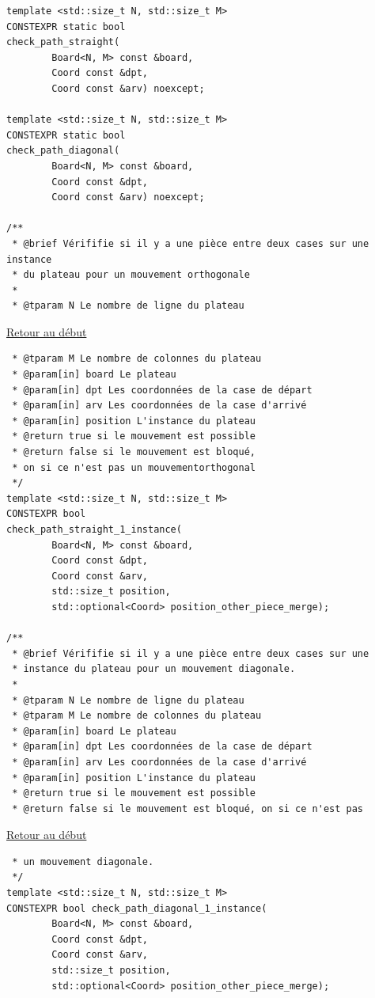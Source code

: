 {\begin{frame}[fragile]
\begin{verbatim}
template <std::size_t N, std::size_t M>
CONSTEXPR static bool
check_path_straight(
		Board<N, M> const &board,
		Coord const &dpt,
		Coord const &arv) noexcept;

template <std::size_t N, std::size_t M>
CONSTEXPR static bool
check_path_diagonal(
		Board<N, M> const &board,
		Coord const &dpt,
		Coord const &arv) noexcept;

/**
 * @brief Vérififie si il y a une pièce entre deux cases sur une instance
 * du plateau pour un mouvement orthogonale
 *
 * @tparam N Le nombre de ligne du plateau
\end{verbatim}
\end{frame}

\begin{frame}[fragile]
\hyperlink{conclusion}{Retour au début}\newline
\begin{verbatim}
 * @tparam M Le nombre de colonnes du plateau
 * @param[in] board Le plateau
 * @param[in] dpt Les coordonnées de la case de départ
 * @param[in] arv Les coordonnées de la case d'arrivé
 * @param[in] position L'instance du plateau
 * @return true si le mouvement est possible
 * @return false si le mouvement est bloqué,
 * on si ce n'est pas un mouvementorthogonal
 */
template <std::size_t N, std::size_t M>
CONSTEXPR bool
check_path_straight_1_instance(
		Board<N, M> const &board,
		Coord const &dpt,
		Coord const &arv,
		std::size_t position,
		std::optional<Coord> position_other_piece_merge);

/**
 * @brief Vérififie si il y a une pièce entre deux cases sur une
 * instance du plateau pour un mouvement diagonale.
 *
 * @tparam N Le nombre de ligne du plateau
 * @tparam M Le nombre de colonnes du plateau
 * @param[in] board Le plateau
 * @param[in] dpt Les coordonnées de la case de départ
 * @param[in] arv Les coordonnées de la case d'arrivé
 * @param[in] position L'instance du plateau
 * @return true si le mouvement est possible
 * @return false si le mouvement est bloqué, on si ce n'est pas
\end{verbatim}
\end{frame}

\begin{frame}[fragile]
\hyperlink{conclusion}{Retour au début}\newline
\begin{verbatim}
 * un mouvement diagonale.
 */
template <std::size_t N, std::size_t M>
CONSTEXPR bool check_path_diagonal_1_instance(
		Board<N, M> const &board,
		Coord const &dpt,
		Coord const &arv,
		std::size_t position,
		std::optional<Coord> position_other_piece_merge);


\end{verbatim}
\end{frame}}

